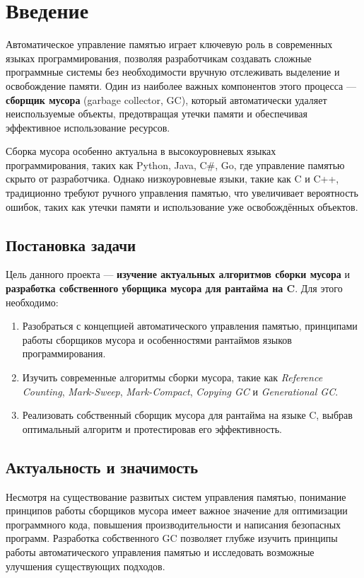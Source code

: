 \section{Введение}


Автоматическое управление памятью играет ключевую роль в современных языках программирования, позволяя разработчикам создавать сложные программные системы без необходимости вручную отслеживать выделение и освобождение памяти. Один из наиболее важных компонентов этого процесса — \textbf{сборщик мусора} (garbage collector, GC), который автоматически удаляет неиспользуемые объекты, предотвращая утечки памяти и обеспечивая эффективное использование ресурсов. 

Сборка мусора особенно актуальна в высокоуровневых языках программирования, таких как Python, Java, C\#, Go, где управление памятью скрыто от разработчика. Однако низкоуровневые языки, такие как C и C++, традиционно требуют ручного управления памятью, что увеличивает вероятность ошибок, таких как утечки памяти и использование уже освобождённых объектов.

\subsection{Постановка задачи}

Цель данного проекта — \textbf{изучение актуальных алгоритмов сборки мусора} и \textbf{разработка собственного уборщика мусора для рантайма на C}. Для этого необходимо:
\begin{enumerate}[label=\arabic*.]
    \item Разобраться с концепцией автоматического управления памятью, принципами работы сборщиков мусора и особенностями рантаймов языков программирования.
    \item Изучить современные алгоритмы сборки мусора, такие как \textit{Reference Counting}, \textit{Mark-Sweep}, \textit{Mark-Compact}, \textit{Copying GC} и \textit{Generational GC}.
    \item Реализовать собственный сборщик мусора для рантайма на языке C, выбрав оптимальный алгоритм и протестировав его эффективность.
\end{enumerate}

\subsection{Актуальность и значимость}

Несмотря на существование развитых систем управления памятью, понимание принципов работы сборщиков мусора имеет важное значение для оптимизации программного кода, повышения производительности и написания безопасных программ. Разработка собственного GC позволяет глубже изучить принципы работы автоматического управления памятью и исследовать возможные улучшения существующих подходов.

